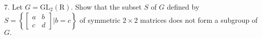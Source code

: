\newpage
\begin{mdframed}[style=darkQuesion]
7. Let $G=\mathrm{GL}_{2}(\mathrm{R})$.
Show that the subset $S$ of $G$ defined by
$S=\left\{\left[\begin{array}{ll}a & b \\
      c & d\end{array}\right] | b=c\right\}$ of symmetric $2   \times 2$ matrices does not form a subgroup of $G .$

\end{mdframed}


